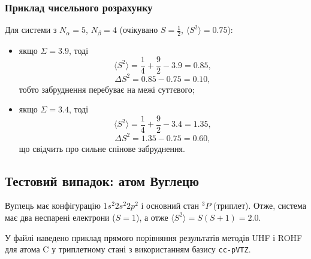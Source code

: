 \subsubsection*{Приклад чисельного розрахунку}

Для системи з $N_\alpha = 5$, $N_\beta = 4$ (очікувано $S=\frac{1}{2}$, $\langle S^2 \rangle = 0.75$):

\begin{itemize}
    \item якщо $\Sigma = 3.9$, тоді
    \[
    \langle S^2 \rangle = \frac{1}{4} + \frac{9}{2} - 3.9 = 0.85,
    \]
    \[
    \Delta S^2 = 0.85 - 0.75 = 0.10,
    \]
    тобто забруднення перебуває на межі суттєвого;

    \item якщо $\Sigma = 3.4$, тоді
    \[
    \langle S^2 \rangle = \frac{1}{4} + \frac{9}{2} - 3.4 = 1.35,
    \]
    \[
    \Delta S^2 = 1.35 - 0.75 = 0.60,
    \]
    що свідчить про сильне спінове забруднення.
\end{itemize}

%


\subsection{Тестовий випадок: атом Вуглецю}

Вуглець має конфігурацію $1s^2 2s^2 2p^2$ і основний стан $^3P$ (триплет).
Отже, система має два неспарені електрони ($S=1$), а отже $\langle S^2 \rangle = S(S+1) = 2.0$.

У файлі  наведено приклад прямого порівняння результатів методів UHF і ROHF для атома C у триплетному стані з використанням базису \texttt{cc-pVTZ}.

